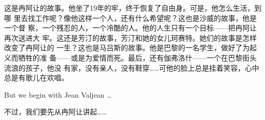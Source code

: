 \documentclass[fontset=ubuntu, zihao=5]{ctexart}
\begin{document}
\begin{paracol}{2}
  \switchcolumn

  这是冉阿让的故事。他坐了19年的牢，终于恢复了自由身。可是，他怎么生活，到哪
  里去找工作呢？像他这样一个人，还有什么希望呢？这也是沙威的故事，他是一个督
  察，一个残忍的人，一个冷酷的人。他的人生只有一个目标——把冉阿让再次送进大
  牢。这还是芳汀的故事，芳汀和她的女儿珂赛特。她们的故事是怎样改变了冉阿让的
  一生？这也是马吕斯的故事。他是巴黎的一名学生，做好了为起义而牺牲的准
  备——或是为爱情而死。最后，还有伽弗洛什——一个在巴黎街头流浪的孩子，他没
  有家，没有亲人，没有鞋穿……可他的脸上总是挂着笑容，心中总是有歌儿在欢唱。

  \switchcolumn*

  But we begin with Jean Valjean \ldots{}


  \switchcolumn

  不过，我们要先从冉阿让讲起……

\end{paracol}

\clearpage
\end{document}
